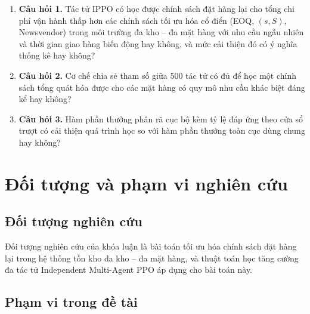 \begin{enumerate}
    \item \textbf{Câu hỏi 1.} Tác tử IPPO có học được chính sách đặt hàng lại
    cho tổng chi phí vận hành thấp hơn các chính sách tối ưu hóa cổ điển
    (EOQ, $(s, S)$, Newsvendor) trong môi trường đa kho -- đa mặt hàng với nhu
    cầu ngẫu nhiên và thời gian giao hàng biến động hay không, và mức cải thiện
    đó có ý nghĩa thống kê hay không?

    \item \textbf{Câu hỏi 2.} Cơ chế chia sẻ tham số giữa $500$ tác tử có đủ để
    học một chính sách tổng quát hóa được cho các mặt hàng có quy mô nhu cầu
    khác biệt đáng kể hay không?

    \item \textbf{Câu hỏi 3.} Hàm phần thưởng phân rã cục bộ kèm tỷ lệ đáp ứng
    theo cửa sổ trượt có cải thiện quá trình học so với hàm phần thưởng toàn
    cục dùng chung hay không?
\end{enumerate}

\section{Đối tượng và phạm vi nghiên cứu}
\label{sec:phamvi}

\subsection{Đối tượng nghiên cứu}
\label{subsec:doituong}

Đối tượng nghiên cứu của khóa luận là bài toán tối ưu hóa chính sách đặt hàng
lại trong hệ thống tồn kho đa kho -- đa mặt hàng, và thuật toán học tăng cường
đa tác tử Independent Multi-Agent PPO áp dụng cho bài toán này.

\subsection{Phạm vi trong đề tài}
\label{subsec:phamvitrong}

